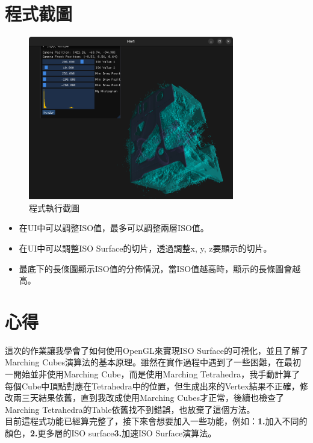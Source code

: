 \documentclass[a4paper,12pt]{article}
\begin{document}
\section{程式截圖}
\begin{figure}[H]
    \centering
    \includegraphics[width=0.8\textwidth]{img/img1.png}
    \caption{程式執行截圖}
    \label{fig:screenshot}
\end{figure}
\begin{itemize}
    \item 在UI中可以調整ISO值，最多可以調整兩層ISO值。
    \item 在UI中可以調整ISO Surface的切片，透過調整x, y, z要顯示的切片。
    \item 最底下的長條圖顯示ISO值的分佈情況，當ISO值越高時，顯示的長條圖會越高。
\end{itemize}

\section{心得}
這次的作業讓我學會了如何使用OpenGL來實現ISO Surface的可視化，並且了解了Marching Cubes演算法的基本原理。雖然在實作過程中遇到了一些困難，在最初一開始並非使用Marching Cube，而是使用Marching Tetrahedra，我手動計算了每個Cube中頂點對應在Tetrahedra中的位置，但生成出來的Vertex結果不正確，修改兩三天結果依舊，直到我改成使用Marching Cubes才正常，後續也檢查了Marching Tetrahedra的Table依舊找不到錯誤，也放棄了這個方法。\\
目前這程式功能已經算完整了，接下來會想要加入一些功能，例如：\textbf{1.}加入不同的顏色，\textbf{2.}更多層的ISO surface\textbf{3.}加速ISO Surface演算法。\\
\end{document}
